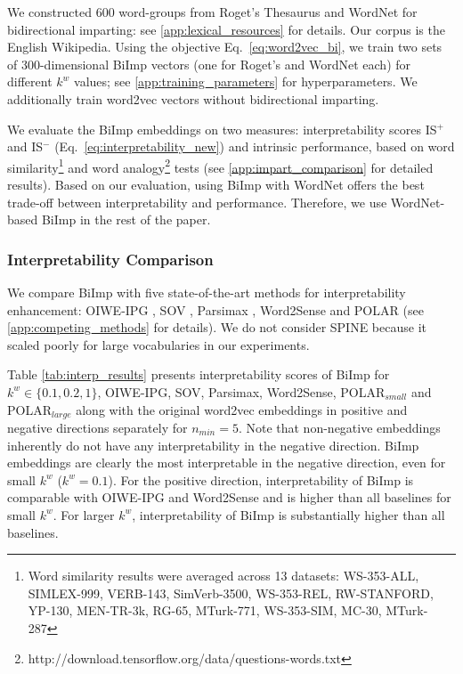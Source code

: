 \documentclass[11pt,a4paper]{article}
\def\proposedmethod{BiImp}
\begin{document}
We constructed 600 word-groups from Roget's
Thesaurus and WordNet for bidirectional imparting: see \ref{app:lexical_resources} for details. 
Our corpus is the English Wikipedia.
Using the objective Eq.\ 
\ref{eq:word2vec_bi},
we train two sets of 300-dimensional \proposedmethod{}
vectors
(one for Roget's and WordNet each)
for
different $k^w$ values; see \ref{app:training_parameters} for
hyperparameters. We additionally train word2vec vectors
without bidirectional imparting.

We evaluate the  \proposedmethod{} embeddings
on two measures: 
interpretability scores IS$^+$ and IS$^-$ (Eq.\
\ref{eq:interpretability_new}) and intrinsic performance,
based on word similarity\footnote{Word similarity results
  were averaged across 13 datasets: WS-353-ALL, SIMLEX-999,
  VERB-143, SimVerb-3500, WS-353-REL, RW-STANFORD, YP-130,
  MEN-TR-3k, RG-65, MTurk-771, WS-353-SIM, MC-30, MTurk-287}
\citep{faruqui14communityEval} and word
analogy\footnote{http://download.tensorflow.org/data/questions-words.txt}
\citep{mikolov13word2vec_b} tests (see
\ref{app:impart_comparison} for detailed results). Based
on our evaluation, using \proposedmethod{} with WordNet
offers the best trade-off between
interpretability and performance. Therefore, we use
WordNet-based \proposedmethod{} in the rest of the paper.

\subsubsection{Interpretability Comparison}
We compare \proposedmethod{}
with five state-of-the-art methods for interpretability
enhancement: OIWE-IPG \citep{luo15online}, SOV
\citep{faruqui15sparse}, Parsimax \citep{park17rotated},
Word2Sense \citep{panigrahi19word2sense} and POLAR
\citep{mathew20polar} (see \ref{app:competing_methods} for
details).
We do not consider
SPINE \citep{subramanian18spine}  because it scaled poorly
for large vocabularies in our experiments.

Table
\ref{tab:interp_results} presents
interpretability
scores of \proposedmethod{} for $k^w \in \{0.1, 0.2, 1\}$,
OIWE-IPG, SOV, Parsimax, Word2Sense, POLAR$_{small}$ and
POLAR$_{large}$ along with the original word2vec embeddings
in positive and negative directions separately for $n_{min}
= 5$.  Note that non-negative embeddings inherently do not
have any interpretability in the negative
direction. \proposedmethod{} embeddings are
clearly the most interpretable in the negative direction,
even for small $k^w$ 
($k^w = 0.1$). For the positive direction, interpretability
of \proposedmethod{} is comparable with OIWE-IPG and
Word2Sense and is higher than all baselines for
small $k^w$. For larger $k^w$, interpretability of
\proposedmethod{} is substantially higher than all baselines.
\end{document}
